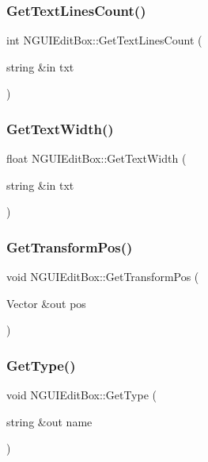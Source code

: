 \subsubsection{\texorpdfstring{Get\+Text\+Lines\+Count()}{GetTextLinesCount()}}
{\footnotesize\ttfamily int N\+G\+U\+I\+Edit\+Box\+::\+Get\+Text\+Lines\+Count (\begin{DoxyParamCaption}\item[{string \&in}]{txt }\end{DoxyParamCaption})}

\hypertarget{class_n_g_u_i_edit_box_aa8e86beb9f031e7fb1be1295cc223286}{}\label{class_n_g_u_i_edit_box_aa8e86beb9f031e7fb1be1295cc223286} 
\subsubsection{\texorpdfstring{Get\+Text\+Width()}{GetTextWidth()}}
{\footnotesize\ttfamily float N\+G\+U\+I\+Edit\+Box\+::\+Get\+Text\+Width (\begin{DoxyParamCaption}\item[{string \&in}]{txt }\end{DoxyParamCaption})}

\hypertarget{class_n_g_u_i_edit_box_ab7e0bd02c1f6efa8576059359f5095e5}{}\label{class_n_g_u_i_edit_box_ab7e0bd02c1f6efa8576059359f5095e5} 
\subsubsection{\texorpdfstring{Get\+Transform\+Pos()}{GetTransformPos()}}
{\footnotesize\ttfamily void N\+G\+U\+I\+Edit\+Box\+::\+Get\+Transform\+Pos (\begin{DoxyParamCaption}\item[{Vector \&out}]{pos }\end{DoxyParamCaption})}

\hypertarget{class_n_g_u_i_edit_box_afdf4360a5cc111188b14c9dfcec9fe91}{}\label{class_n_g_u_i_edit_box_afdf4360a5cc111188b14c9dfcec9fe91} 
\subsubsection{\texorpdfstring{Get\+Type()}{GetType()}}
{\footnotesize\ttfamily void N\+G\+U\+I\+Edit\+Box\+::\+Get\+Type (\begin{DoxyParamCaption}\item[{string \&out}]{name }\end{DoxyParamCaption})}


